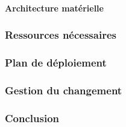 \paragraph{Architecture matérielle}

\subsubsection{Ressources nécessaires}

\subsubsection{Plan de déploiement}

\subsubsection{Gestion du changement}

\subsubsection{Conclusion}